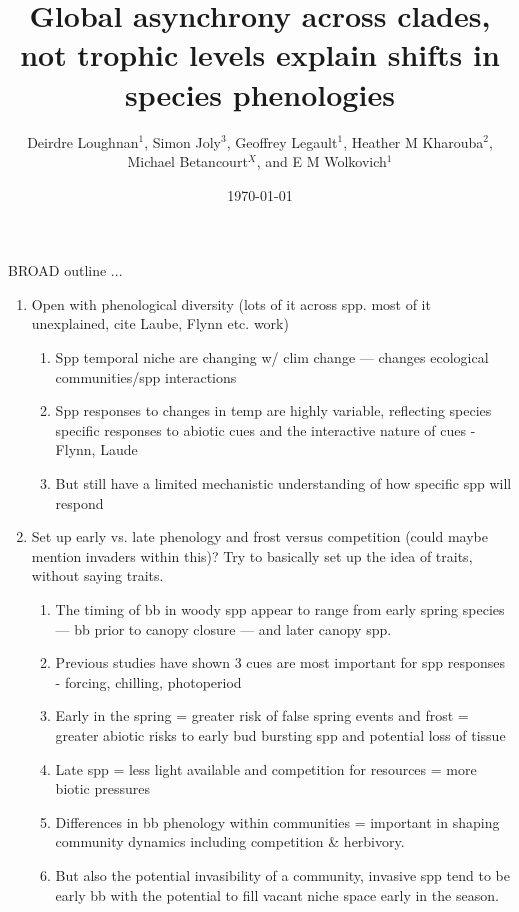 \documentclass{article}
\begin{document}
\title{Global asynchrony across clades, not trophic levels explain shifts in species phenologies}
\date{\today}
\author{Deirdre Loughnan$^1$, Simon Joly$^3$, Geoffrey Legault$^1$, Heather M Kharouba$^2$, \\Michael Betancourt$^X$, and E M Wolkovich$^1$} 
\maketitle 

BROAD outline ...

\begin{enumerate}
\item Open with phenological diversity (lots of it across spp. most of it unexplained, cite Laube, Flynn etc. work)

\begin{enumerate}
\item Spp temporal niche are changing w/ clim change — changes ecological communities/spp interactions
\item Spp responses to changes in temp are highly variable, reflecting species specific responses to abiotic cues and the interactive nature of cues - Flynn, Laude
\item But still have a limited mechanistic understanding of how specific spp will respond
\end{enumerate}

\item Set up early vs. late phenology and frost versus competition (could maybe mention invaders within this)? Try to basically set up the idea of traits, without saying traits.

\begin{enumerate}
\item The timing of bb in woody spp appear to range from early spring species — bb prior to canopy closure — and later canopy spp. 
\item Previous studies have shown 3 cues are most important for spp responses - forcing, chilling, photoperiod
\item Early in the spring = greater risk of false spring events and frost = greater abiotic risks to early bud bursting spp and potential loss of tissue
\item Late spp = less light available and competition for resources = more biotic pressures
\item Differences in bb phenology within communities = important in shaping community dynamics including competition \& herbivory. 
\item But also the potential invasibility of a community, invasive spp tend to be early bb with the potential to fill vacant niche space early in the season. 
\end{enumerate}


\end{enumerate}
\end{document}
